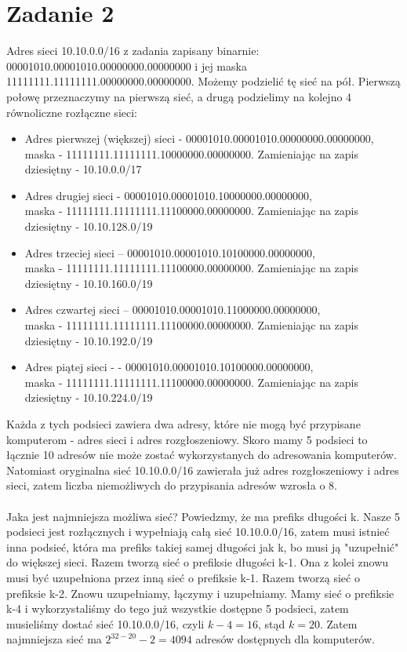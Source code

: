 \documentclass[11pt,wide]{article}
\begin{document}
\section{Zadanie 2}
Adres sieci 10.10.0.0/16 z zadania zapisany binarnie: 00001010.00001010.00000000.00000000 i jej maska 11111111.11111111.00000000.00000000. Możemy podzielić tę sieć na pół. Pierwszą połowę przeznaczymy na pierwszą sieć, a drugą podzielimy na kolejno 4 równoliczne rozłączne sieci:\\
\begin{itemize}
\item Adres pierwszej (większej) sieci - 00001010.00001010.00000000.00000000, \\maska - 11111111.11111111.10000000.00000000. Zamieniając na zapis dziesiętny - 10.10.0.0/17
\item Adres drugiej sieci - 00001010.00001010.10000000.00000000, \\maska - 11111111.11111111.11100000.00000000. Zamieniając na zapis dziesiętny - 10.10.128.0/19
\item Adres trzeciej sieci -- 00001010.00001010.10100000.00000000, \\maska - 11111111.11111111.11100000.00000000. Zamieniając na zapis dziesiętny - 10.10.160.0/19
\item Adres czwartej sieci -- 00001010.00001010.11000000.00000000, \\maska - 11111111.11111111.11100000.00000000. Zamieniając na zapis dziesiętny - 10.10.192.0/19
\item Adres piątej sieci - - 00001010.00001010.10100000.00000000, \\maska - 11111111.11111111.11100000.00000000. Zamieniając na zapis dziesiętny - 10.10.224.0/19
\end{itemize}
Każda z tych podsieci zawiera dwa adresy, które nie mogą być przypisane komputerom - adres sieci i adres rozgłoszeniowy. Skoro mamy 5 podsieci to łącznie 10 adresów nie może zostać wykorzystanych do adresowania komputerów. Natomiast oryginalna sieć 10.10.0.0/16 zawierała już adres rozgłoszeniowy i adres sieci, zatem liczba niemożliwych do przypisania adresów wzrosła o 8.\\\\
Jaka jest najmniejsza możliwa sieć? Powiedzmy, że ma prefiks długości k. Nasze 5 podsieci jest rozłącznych i wypełniają całą sieć 10.10.0.0/16, zatem musi istnieć inna podsieć, która ma prefiks takiej samej długości jak k, bo musi ją "uzupełnić" do większej sieci. Razem tworzą sieć o prefiksie długości k-1. Ona z kolei znowu musi być uzupełniona przez inną sieć o prefiksie k-1. Razem tworzą sieć o prefiksie k-2. Znowu uzupełniamy, łączymy i uzupełniamy. Mamy sieć o prefiksie k-4 i wykorzystaliśmy do tego już wszystkie dostępne 5 podsieci, zatem musieliśmy dostać sieć 10.10.0.0/16, czyli $k-4=16 $, stąd $k = 20$. Zatem najmniejsza sieć ma $2^{32-20} - 2 = 4094$ adresów dostępnych dla komputerów.
\end{document}
